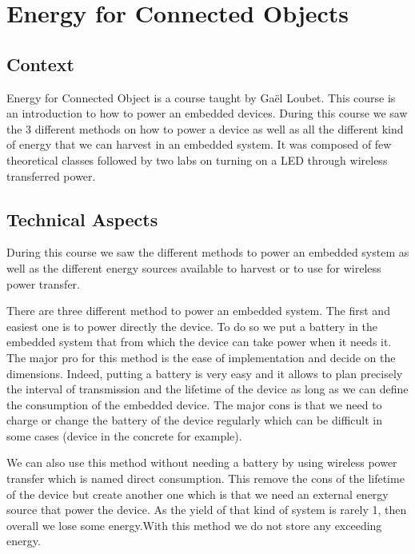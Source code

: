 \section{Energy for Connected Objects}

\subsection{Context}

Energy for Connected Object is a course taught by Gaël Loubet. This course is an introduction to how to power an embedded devices. During this course we saw the 3 different methods on how to power a device as well as all the different kind of energy that we can harvest in an embedded system. It was composed of few theoretical classes followed by two labs on turning on a LED through wireless transferred power.

\subsection{Technical Aspects}

During this course we saw the different methods to power an embedded system as well as the different energy sources available to harvest or to use for wireless power transfer.
\\\par

There are three different method to power an embedded system. The first and easiest one is to power directly the device. To do so we put a battery in the embedded system that from which the device can take power when it needs it. The major pro for this method is the ease of implementation and decide on the dimensions. Indeed, putting a battery is very easy and it allows to plan precisely the interval of transmission and the lifetime of the device as long as we can define the consumption of the embedded device. The major cons is that we need to charge or change the battery of the device  regularly which can be difficult in some cases (device in the concrete for example).
\par 
We can also use this method without needing a battery by using wireless power transfer which is named direct consumption. This remove the cons of the lifetime of the device but create another one which is that we need an external energy source that power the device. As the yield of that kind of system is rarely 1, then overall we lose some energy.With this method we do not store any exceeding energy.
\\\par

